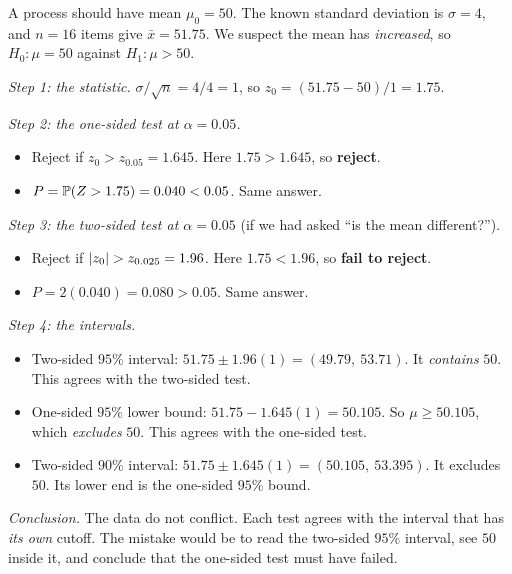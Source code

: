 \begin{example}
A process should have mean $\mu_0=50$. The known standard deviation is $\sigma=4$, and $n=16$ items give $\bar{x}=51.75$. We suspect the mean has \emph{increased}, so $H_0:\mu=50$ against $H_1:\mu>50$.

\emph{Step 1: the statistic.} $\sigma/\sqrt n=4/4=1$, so $z_0=(51.75-50)/1=1.75$.

\emph{Step 2: the one-sided test at $\alpha=0.05$.}
\begin{itemize}
  \item Reject if $z_0>z_{0.05}=1.645$. Here $1.75>1.645$, so \textbf{reject}.
  \item $P=\mathbb{P}(Z>1.75)=0.040<0.05$. Same answer.
\end{itemize}

\emph{Step 3: the two-sided test at $\alpha=0.05$} (if we had asked ``is the mean different?'').
\begin{itemize}
  \item Reject if $\lvert z_0\rvert>z_{0.025}=1.96$. Here $1.75<1.96$, so \textbf{fail to reject}.
  \item $P=2(0.040)=0.080>0.05$. Same answer.
\end{itemize}

\emph{Step 4: the intervals.}
\begin{itemize}
  \item Two-sided $95\%$ interval: $51.75\pm1.96(1)=(49.79,\ 53.71)$. It \emph{contains} $50$. This agrees with the two-sided test.
  \item One-sided $95\%$ lower bound: $51.75-1.645(1)=50.105$. So $\mu\ge50.105$, which \emph{excludes} $50$. This agrees with the one-sided test.
  \item Two-sided $90\%$ interval: $51.75\pm1.645(1)=(50.105,\ 53.395)$. It excludes $50$. Its lower end is the one-sided $95\%$ bound.
\end{itemize}

\emph{Conclusion.} The data do not conflict. Each test agrees with the interval that has \emph{its own} cutoff. The mistake would be to read the two-sided $95\%$ interval, see $50$ inside it, and conclude that the one-sided test must have failed.
\end{example}

